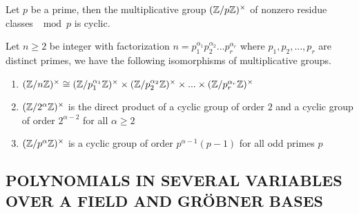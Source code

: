 \begin{corollary}
	Let $p$ be a prime, then the multiplicative group $(\mathbb{Z} / p\mathbb{Z})^\times$ of nonzero residue classes $\mod p$ is cyclic.
\end{corollary}

\begin{corollary}
	Let $n \geq 2$ be integer with factorization $n = p_1^{\alpha_1} p_2^{\alpha_2} ... p_r^{\alpha_r}$ where $p_1, p_2, ..., p_r$ are distinct primes, we have the following isomorphisms of multiplicative groups.
	\begin{enumerate}
		\item 
		$
			(\mathbb{Z} / n\mathbb{Z})^\times \cong (\mathbb{Z} / p_1^{\alpha_1} \mathbb{Z})^\times \times (\mathbb{Z} / p_2^{\alpha_2} \mathbb{Z})^\times  \times ... \times (\mathbb{Z} / p_r^{\alpha_r} \mathbb{Z})^\times
		$
		
		\item $(\mathbb{Z} / 2^\alpha \mathbb{Z})^\times$ is the direct product of a cyclic group of order $2$ and a cyclic group of order $2^{\alpha - 2}$ for all $\alpha \geq 2$
		
		\item $(\mathbb{Z} / p^\alpha \mathbb{Z})^\times$ is a cyclic group of order $p^{\alpha-1}(p-1)$ for all odd primes $p$
	\end{enumerate}
\end{corollary}

\subsection{POLYNOMIALS IN SEVERAL VARIABLES OVER A FIELD AND GRÖBNER BASES}



 
 
 
 